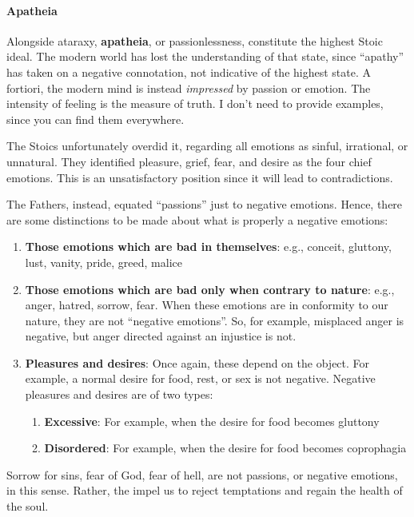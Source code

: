 \paragraph{Apatheia}
Alongside ataraxy, \textbf{apatheia}, or passionlessness, constitute the highest Stoic ideal. The modern world has lost
the understanding of that state, since “apathy” has taken on a negative connotation, not indicative of the highest
state. A fortiori, the modern mind is instead \emph{impressed} by passion or emotion. The intensity of feeling is the
measure of truth. I don’t need to provide examples, since you can find them everywhere.

The Stoics unfortunately overdid it, regarding all emotions as sinful, irrational, or unnatural. They identified
pleasure, grief, fear, and desire as the four chief emotions. This is an unsatisfactory position since it will lead to
contradictions.

The Fathers, instead, equated “passions” just to negative emotions. Hence, there are some distinctions to be made about
what is properly a negative emotions:

\begin{enumerate}
\item \textbf{Those emotions which are bad in themselves}: e.g., conceit, gluttony, lust, vanity, pride, greed, malice 
\item \textbf{Those emotions which are bad only when contrary to nature}: e.g., anger, hatred, sorrow, fear. When these
emotions are in conformity to our nature, they are not “negative emotions”. So, for example, misplaced anger is
negative, but anger directed against an injustice is not. 
\item \textbf{Pleasures and desires}: Once again, these depend on the object. For example, a normal desire for food,
rest, or sex is not negative. Negative pleasures and desires are of two types: 

\begin{enumerate}
\item \textbf{Excessive}: For example, when the desire for food becomes gluttony 
\item \textbf{Disordered}: For example, when the desire for food becomes coprophagia 
\end{enumerate}
\end{enumerate}
Sorrow for sins, fear of God, fear of hell, are not passions, or negative emotions, in this sense. Rather, the impel us
to reject temptations and regain the health of the soul.

